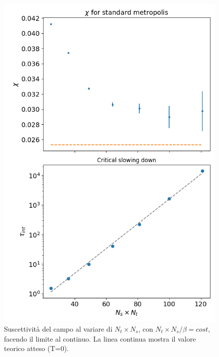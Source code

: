 \documentclass[a4paper, 12pt]{article}
\begin{document}
\begin{figure}
\includegraphics[width=\linewidth]{../figure/suscettivity.png}
\caption{Suscettività del campo al variare di $N_t \times N_s$,
con $N_t \times N_s / \beta = cost$, facendo il limite al continuo.
La linea continua mostra il valore teorico atteso (T=0).}
\label{U1gaugefield_suscettivity}
\end{figure}
\end{document}
